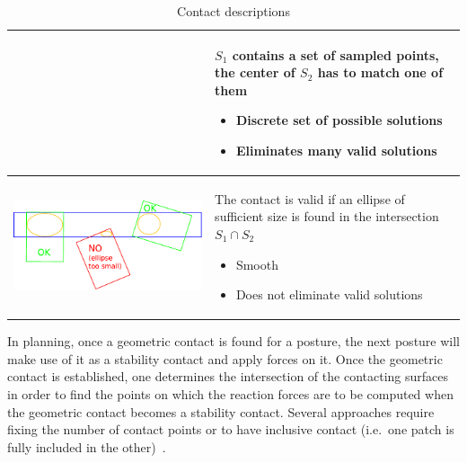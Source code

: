 \begin{table}[ht!]
\begin{tabular}{c m{8cm}}
\begin{minipage}{.4\textwidth}
    \end{minipage}
    &
    $S_1$ contains a set of sampled points, the center of $S_2$ has to match one of them
    \begin{itemize}
      \item Discrete set of possible solutions
      \item Eliminates many valid solutions
    \end{itemize}
    \\ \midrule
    \begin{minipage}{.4\textwidth}
      \includegraphics[width=0.9\linewidth]{contact4.pdf}
    \end{minipage}
    &
    The contact is valid if an ellipse of sufficient size is found in
    the intersection $S_1 \cap S_2$
    \begin{itemize}
      \item Smooth
      \item Does not eliminate valid solutions
    \end{itemize}
    \\ \bottomrule
  \end{tabular}
  \caption{Contact descriptions}
\label{tbl:contact_description}
\end{table}

In planning, once a geometric contact is found for a posture, the next posture will make use of it as a stability contact and apply forces on it.
Once the geometric contact is established, one determines the intersection of the contacting surfaces in order to find the points on which the reaction forces are to be computed when the geometric contact becomes a stability contact.
Several approaches require fixing the number of contact points or to have inclusive contact (i.e.\ one patch is fully included in the other)~\cite{bouyarmane:ar:2012}.

